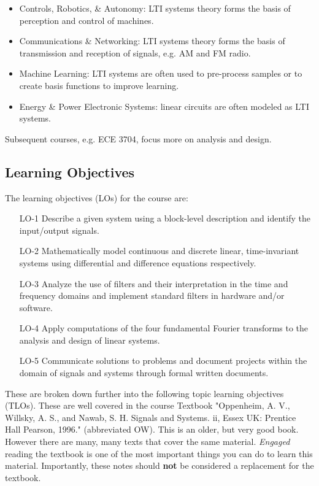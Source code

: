 \begin{itemize}
\item Controls, Robotics, \& Autonomy: LTI systems theory forms the basis of perception and control of machines.
\item Communications \& Networking: LTI systems theory forms the basis of transmission and reception of signals, e.g. AM and FM radio.
\item Machine Learning: LTI systems are often used to pre-process samples or to create basis functions to improve learning.
\item Energy \& Power Electronic Systems: linear circuits are often modeled as LTI systems.
\end{itemize}

Subsequent courses, e.g. ECE 3704, focus more on analysis and design.

\subsection*{Learning Objectives}

The learning objectives (LOs) for the course are:
\begin{enumerate}
\item[LO-1] Describe a given system using a block-level description and identify the input/output signals.
\item[LO-2] Mathematically model continuous and discrete linear, time-invariant systems using differential and difference equations respectively.
\item[LO-3] Analyze the use of filters and their interpretation in the time and frequency domains and implement standard filters in hardware and/or software.
\item[LO-4] Apply computations of the four fundamental Fourier transforms to the analysis and design of linear systems.
\item[LO-5] Communicate solutions to problems and document projects within the domain of signals and systems through formal written documents.
\end{enumerate}

These are broken down further into the following topic learning objectives (TLOs). These are well covered in the course Textbook "Oppenheim, A. V., Willsky, A. S., and Nawab, S. H. Signals and Systems. ii, Essex UK: Prentice Hall Pearson, 1996." (abbreviated OW). This is an older, but very good book. However there are many, many texts that cover the same material. \textit{Engaged} reading the textbook is one of the most important things you can do to learn this material. Importantly, these notes should \textbf{not} be considered a replacement for the textbook.


